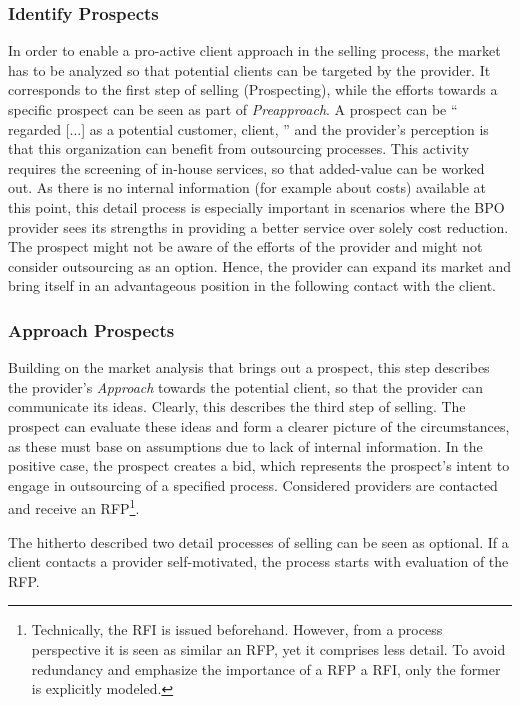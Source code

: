 	\subsubsection{Identify Prospects}
	In order to enable a pro-active client approach in the selling process, the market has to be analyzed so that potential clients can be targeted by the provider. It corresponds to the first step of selling (Prospecting), while the efforts towards a specific prospect can be seen as part of \textit{Preapproach}. 
	A prospect can be \enquote{ regarded [...] as a potential customer, client, \etc} \citep{oxfordprospect} and the provider's perception is that this organization can benefit from outsourcing processes. This activity requires the screening of in-house services, so that added-value can be worked out. As there is no internal information (for example about costs) available at this point, this detail process is especially important in scenarios where the \acrshort{BPO} provider sees its strengths in providing a better service over solely cost reduction. The prospect might not be aware of the efforts of the provider and might not consider outsourcing as an option. Hence, the provider can expand its market and bring itself in an advantageous position in the following contact with the client. 
	
	
	\subsubsection{Approach Prospects}
	
	Building on the market analysis that brings out a prospect, this step describes the provider's \textit{Approach} towards the potential client, so that the provider can communicate its ideas. Clearly, this describes the third step of selling. The prospect can evaluate these ideas and form a clearer picture of the circumstances, as these must base on assumptions due to lack of internal information. In the positive case, the prospect creates a bid, which represents the prospect's intent to engage in outsourcing of a specified process. Considered providers are contacted and receive an \acrshort{RFP}\footnote{Technically, the \acrshort{RFI} is issued beforehand. However, from a process perspective it is seen as similar an \acrshort{RFP}, yet it comprises less detail. To avoid redundancy and emphasize the importance of a \acrshort{RFP} \wrt a \acrshort{RFI}, only the former is explicitly modeled.}.
	
	The hitherto described two detail processes of selling can be seen as optional. If a client contacts a provider self-motivated, the process starts with evaluation of the \acrshort{RFP}.  
	
